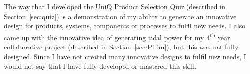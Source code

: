 The way that I developed the UniQ Product Selection Quiz (described in Section~\ref{sec:quiz}) is a demonstration of my ability to generate an innovative design for products, systems, components or processes to fulfil new needs.
I also came up with the innovative idea of generating tidal power for my 4\textsuperscript{th} year collaborative project (described in Section~\ref{sec:P10m}), but this was not fully designed.
Since I have not created many innovative designs to fulfil new needs, I would not say that I have fully developed or mastered this skill.


